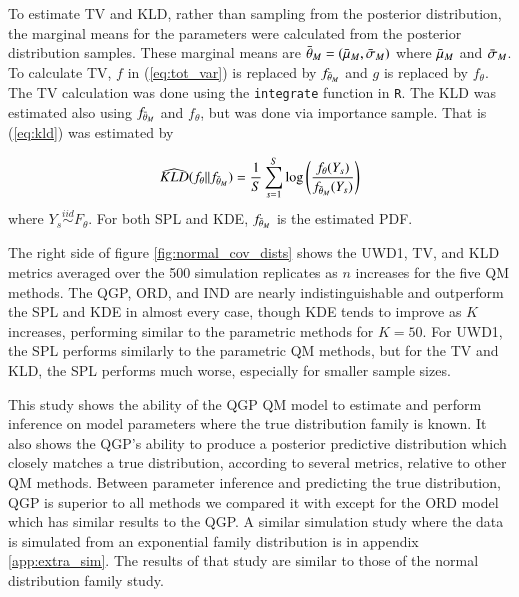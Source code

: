 \documentclass[preprint,12pt,authoryear]{elsarticle}
\begin{document}
To estimate TV and KLD, rather than sampling from the posterior distribution, the marginal means for the parameters were calculated from the posterior distribution samples. These marginal means  are $\Bar{\theta}_M = (\Bar{\mu}_M, \Bar{\sigma}_M)$ where $\Bar{\mu}_M$ and $\Bar{\sigma}_M$. To calculate TV, $f$ in (\ref{eq:tot_var}) is replaced by $f_{\Bar{\theta}_M}$ and $g$ is replaced by $f_{\theta}$. The TV calculation was done using the \texttt{integrate} function in \texttt{R}. The KLD was estimated also using $f_{\Bar{\theta}_M}$ and $f_{\theta}$, but was done via importance sample. That is (\ref{eq:kld}) was estimated by

\[
    \widehat{KLD}(f_{\theta} || f_{\Bar{\theta}_M}) = \frac{1}{S}\sum_{s = 1}^S \text{log} \left(\frac{f_{\theta}(Y_s)}{f_{\Bar{\theta}_M}(Y_s)}\right)
\]
where $Y_s \overset{iid}{\sim} F_{\theta}$. For both SPL and KDE, $f_{\Bar{\theta}_M}$ is the estimated PDF.


The right side of figure \ref{fig:normal_cov_dists} shows the UWD1, TV, and KLD metrics averaged over the 500 simulation replicates as $n$ increases for the five QM methods. The QGP, ORD, and IND are nearly indistinguishable and outperform the SPL and KDE in almost every case, though KDE tends to improve as $K$ increases, performing similar to the parametric methods for $K = 50$. For UWD1, the SPL performs similarly to the parametric QM methods, but for the TV and KLD, the SPL performs much worse, especially for smaller sample sizes. 

This study shows the ability of the QGP QM model to estimate and perform inference on model parameters where the true distribution family is known. It also shows the QGP's ability to produce a posterior predictive distribution which closely matches a true distribution, according to several metrics, relative to other QM methods. Between parameter inference and predicting the true distribution, QGP is superior to all methods we compared it with except for the ORD model which has similar results to the QGP. A similar simulation study where the data is simulated from an exponential family distribution is in appendix \ref{app:extra_sim}. The results of that study are similar to those of the normal distribution family study.

\end{document}
